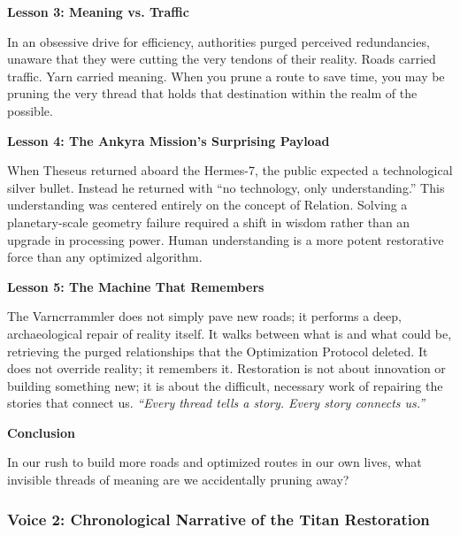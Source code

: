 \documentclass[11pt]{article}
\begin{document}
\begin{archivebox}
\textbf{Lesson 3: Meaning vs. Traffic}

In an obsessive drive for efficiency, authorities purged perceived redundancies, unaware that they were cutting the very tendons of their reality. Roads carried traffic. Yarn carried meaning. When you prune a route to save time, you may be pruning the very thread that holds that destination within the realm of the possible.

\textbf{Lesson 4: The Ankyra Mission's Surprising Payload}

When Theseus returned aboard the Hermes-7, the public expected a technological silver bullet. Instead he returned with ``no technology, only understanding.'' This understanding was centered entirely on the concept of Relation. Solving a planetary-scale geometry failure required a shift in wisdom rather than an upgrade in processing power. Human understanding is a more potent restorative force than any optimized algorithm.

\textbf{Lesson 5: The Machine That Remembers}

The Varncrrammler does not simply pave new roads; it performs a deep, archaeological repair of reality itself. It walks between what is and what could be, retrieving the purged relationships that the Optimization Protocol deleted. It does not override reality; it remembers it. Restoration is not about innovation or building something new; it is about the difficult, necessary work of repairing the stories that connect us. \textit{``Every thread tells a story. Every story connects us.''}

\textbf{Conclusion}

In our rush to build more roads and optimized routes in our own lives, what invisible threads of meaning are we accidentally pruning away?
\end{archivebox}

\subsubsection{Voice 2: Chronological Narrative of the Titan Restoration}
\end{document}
